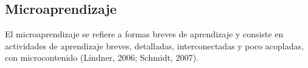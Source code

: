 
\subsection{Microaprendizaje}
El microaprendizaje se refiere a formas breves de aprendizaje y consiste en
actividades de aprendizaje breves, detalladas, interconectadas y poco acopladas,
con microcontenido (Lindner, 2006; Schmidt, 2007).
\cite{article:microlearning_buchem}